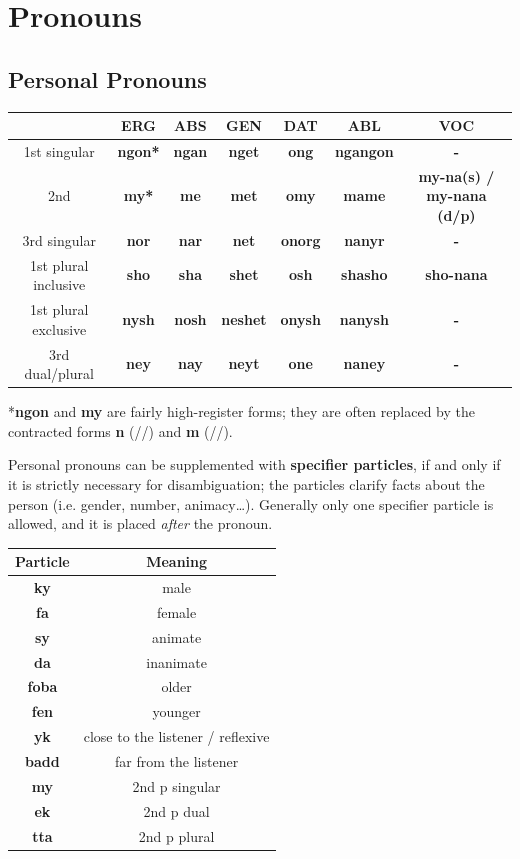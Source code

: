 \documentclass[10pt,oneside]{memoir}
\newcommand{\ipa}[1]{/\textipa{#1}/}
\newcommand{\nf}[1]{{\normalfont #1}}
\begin{document}
\section{Pronouns}\label{pronouns}

\subsection{Personal Pronouns}

\begin{center}
    \begin{tabular}{c || *{6}{>{\bfseries}c}}
        & \nf{ERG}   & \nf{ABS}   & \nf{GEN}   & \nf{DAT}   & \nf{ABL}       & \nf{VOC} \\ \hline
    1st singular        & ngon*  & ngan  & nget       & ong   & ngangon   & - \\
    2nd                 & my*    & me    & met        & omy   & mame      & my-na(s) / my-nana (d/p)\\
    3rd singular        & nor   & nar   & net       & onorg & nanyr  & -       \\
   1st plural inclusive & sho   & sha   & shet        & osh   & shasho  & sho-nana          \\
   1st plural exclusive & nysh  & nosh  & neshet        & onysh & nanysh  & -          \\
   3rd dual/plural      & ney   & nay   & neyt        & one   & naney   & -
    \end{tabular}
\end{center}

*\textbf{ngon} and \textbf{my} are fairly high-register forms; they are often replaced by the contracted forms \textbf{n} (\ipa{\s{n}}) and \textbf{m} (\ipa{\s{m}}).

Personal pronouns can be supplemented with \textbf{specifier particles}, if and only if it is strictly necessary for disambiguation; the particles clarify facts about the person (i.e. gender, number, animacy\ldots). Generally only one specifier particle is allowed, and it is placed \emph{after} the pronoun.

\begin{center}
    \begin{tabular}[]{>{\bfseries}c | c}
        Particle & Meaning\\
        \hline
        ky & male\\
        fa & female\\
        sy & animate\\
        da & inanimate\\
        foba & older\\
        fen & younger\\
        yk & close to the listener / reflexive\\
        badd & far from the listener\\
        \hline
        my & 2nd p singular\\
        ek & 2nd p dual\\
        tta & 2nd p plural

    \end{tabular}
\end{center}
\end{document}
